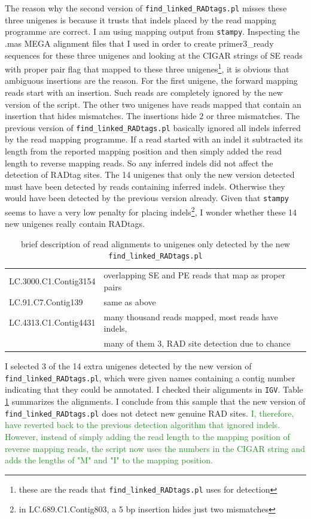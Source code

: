 \documentclass{article}\usepackage[]{graphicx}\usepackage[]{color}
\newcommand{\roger}[1]{ \textcolor[named]{ForestGreen}{#1} }
\begin{document}
The reason why the second version of \texttt{find\_linked\_RADtags.pl} misses these three unigenes is because it trusts that indels placed by the read mapping programme are correct. I am using mapping output from \texttt{stampy}.  Inspecting the .mas MEGA alignment files that I used in order to create primer3\_ready sequences for these three unigenes and looking at the CIGAR strings of SE reads with proper pair flag that mapped to these three unigenes\footnote{these are the reads that \texttt{find\_linked\_RADtags.pl} uses for detection}, it is obvious that ambiguous insertions are the reason. For the first unigene, the forward mapping reads start with an insertion. Such reads are completely ignored by the new version of the script. The other two unigenes have reads mapped that contain an insertion that hides mismatches. The insertions hide 2 or three mismatches. The previous version of \texttt{find\_linked\_RADtags.pl} basically ignored all indels inferred by the read mapping programme. If a read started with an indel it subtracted its length from the reported mapping position and then simply added the read length to reverse mapping reads. So any inferred indels did not affect the detection of RADtag sites. The 14 unigenes that only the new version detected must have been detected by reads containing inferred indels. Otherwise they would have been detected by the previous version already. Given that \texttt{stampy} seems to have a very low penalty for placing indels\footnote{in LC.689.C1.Contig803, a 5 bp insertion hides just two mismatches}, I wonder whether these 14 new unigenes really contain RADtags.

\begin{table}[h]
\centering
\caption{brief description of read alignments to unigenes only detected by the new \texttt{find\_linked\_RADtags.pl}}
\label{extra-unigenes}
\begin{tabular}{ll}
\toprule
LC.3000.C1.Contig3154 & overlapping SE and PE reads that map as proper pairs \\
LC.91.C7.Contig139 &  same as above \\
LC.4313.C1.Contig4431 & many thousand reads mapped, most reads have indels, \\
& many of them 3, RAD site detection due to chance \\
\bottomrule
\end{tabular}
\end{table}

I selected 3 of the 14 extra unigenes detected by the new version of \texttt{find\_linked\_RADtags.pl}, which were given names containing a contig number indicating that they  could be annotated. I checked their alignments in \texttt{IGV}. Table \ref{extra-unigenes} summarizes the alignments. I conclude from this sample that the new version of \texttt{find\_linked\_RADtags.pl} does not detect new genuine RAD sites. \roger{I, therefore, have reverted back to the previous detection algorithm that ignored indels. However, instead of simply adding the read length to the mapping position of reverse mapping reads, the script now uses the numbers in the CIGAR string and adds the lengths of "M" and "I" to the mapping position.}
\end{document}
